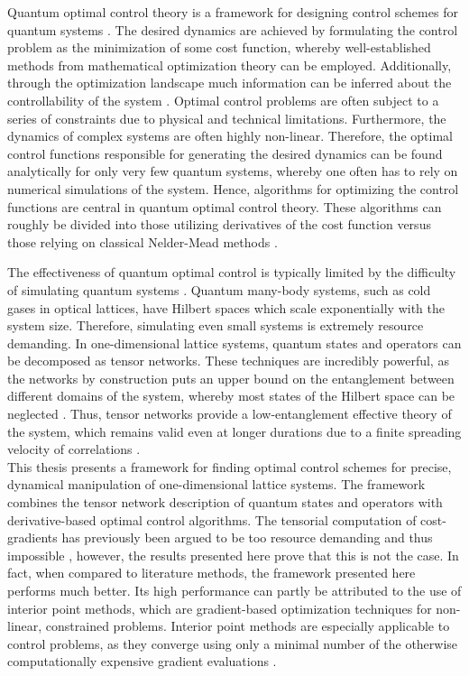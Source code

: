 Quantum optimal control theory is a framework for designing control schemes for quantum systems \cite{Peirce1988,Werschnik2007}. The desired dynamics are achieved by formulating the control problem as the minimization of some cost function, whereby well-established methods from mathematical optimization theory can be employed. Additionally, through the optimization landscape much information can be inferred about the controllability of the system \cite{Rabitz2004}. Optimal control problems are often subject to a series of constraints due to physical and technical limitations. Furthermore, the dynamics of complex systems are often highly non-linear. Therefore, the optimal control functions responsible for generating the desired dynamics can be found analytically for only very few quantum systems, whereby one often has to rely on numerical simulations of the system. Hence, algorithms for optimizing the control functions are central in quantum optimal control theory. These algorithms can roughly be divided into those utilizing derivatives of the cost function \cite{Khaneja2005,Krotov1995} versus those relying on classical Nelder-Mead methods \cite{Doria2011}.

The effectiveness of quantum optimal control is typically limited by the difficulty of simulating quantum systems \cite{Vidal2003}. Quantum many-body systems, such as cold gases in optical lattices, have Hilbert spaces which scale exponentially with the system size. Therefore, simulating even small systems is extremely resource demanding. In one-dimensional lattice systems, quantum states and operators can be decomposed as tensor networks. These techniques are incredibly powerful, as the networks by construction puts an upper bound on the entanglement between different domains of the system, whereby most states of the Hilbert space can be neglected \cite{schollwock,Cramer}. Thus, tensor networks provide a low-entanglement effective theory of the system, which remains valid even at longer durations due to a finite spreading velocity of correlations \cite{Bravyi2006,Eisert2006}.\\

This thesis presents a framework for finding optimal control schemes for precise, dynamical manipulation of one-dimensional lattice systems. The framework combines the tensor network description of quantum states and operators with derivative-based optimal control algorithms. The tensorial computation of cost-gradients has previously been argued to be too resource demanding and thus impossible \cite{Doria2011}, however, the results presented here prove that this is not the case. In fact, when compared to literature methods, the framework presented here performs much better. Its high performance can partly be attributed to the use of interior point methods, which are gradient-based optimization techniques for non-linear, constrained problems. Interior point methods are especially applicable to control problems, as they converge using only a minimal number of the otherwise computationally expensive gradient evaluations \cite{wright}.

